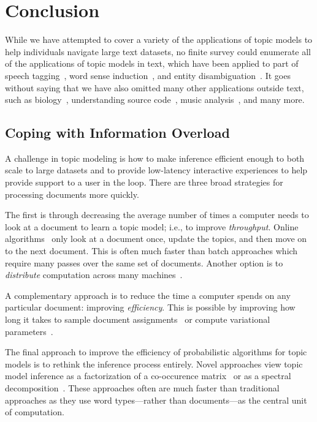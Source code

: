 
\chapter{Conclusion}
\label{ch:conc}

While we have attempted to cover a variety of the applications of
topic models to help individuals navigate large text datasets, no
finite survey could enumerate all of the applications of topic models
in text, which have been applied to part of speech
tagging~\citep{toutanova-08}, word sense induction~\citep{brody-09},
and entity disambiguation~\citep{kataria-11}.  It goes without saying
that we have also omitted many other applications outside text, such
as biology~\citep{pritchard-00}, understanding source
code~\citep{maskeri-08}, music analysis~\citep{hu-09}, and many more.

\section{Coping with Information Overload}
\label{sec:fast-inference}

A challenge in topic modeling is how to make inference efficient
enough to both scale to large datasets and to provide low-latency
interactive experiences to help provide support to a user in the loop.
There are three broad strategies for processing documents
more quickly.


The first is through decreasing the average number of times a computer
needs to look at a document to learn a topic model; i.e., to improve
\emph{throughput}.  Online algorithms~\citep{hoffman-10} only look at a
document once, update the topics, and then move on to the next
document.  This is often much faster than batch approaches which
require many passes over the same set of documents.  Another option is
to \emph{distribute} computation across many machines~\citep{zhai-12}.

A complementary approach is to reduce the time a computer spends on
any particular document: improving \emph{efficiency}.  This is
possible by improving how long it takes to sample document
assignments~\citep{yao-09,li2014reducing} or compute variational
parameters~\citep{mimno-12}.

The final approach to improve the efficiency of probabilistic
algorithms for topic models is to rethink the inference process
entirely.  Novel approaches view topic model inference as a
factorization of a co-occurence matrix~\citep{arora-13} or as a spectral
decomposition~\citep{anandkumar-12}.  These approaches often are much faster than
traditional approaches as they use word types---rather than
documents---as the central unit of computation.

